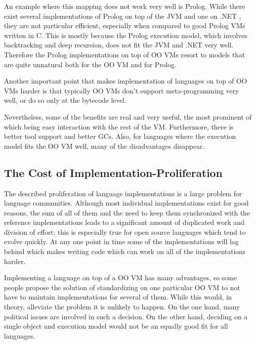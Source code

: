 \documentclass{llncs}
\begin{document}
\begin{itemize}
An example where this mapping does not work very well is Prolog. While there
exist several implementations of Prolog on top of the JVM \cite{prologcafe}
\cite{InterProlog} and one on .NET \cite{psharp},
they are not particular efficient, especially when compared to good Prolog VMs
written in C. This is mostly because the Prolog execution model, which
involves backtracking and deep recursion, does not fit the JVM and .NET very
well. Therefore the Prolog implementations on top of OO VMs resort to models
that are quite unnatural both for the OO VM and for Prolog.

Another important point that makes implementation of languages on top of OO VMs
harder is that typically OO VMs don't support meta-programming very well, or do so only
at the bytecode level.
\end{itemize}

Nevertheless, some of the benefits are real and very useful, the most
prominent of which being easy interaction with the rest of the VM. Furthermore, there
is better tool support and better GCs. Also, for languages where the execution
model fits the OO VM well, many of the disadvantages disappear.


\subsection{The Cost of Implementation-Proliferation}

The described proliferation of language implementations is a large problem for
language communities. Although most individual implementations exist for good
reasons, the sum of all of them and the need to keep them synchronized with the
reference implementations leads to a significant amount of duplicated work and division of
effort; this is especially true for open source languages which tend to evolve
quickly. At any one point in time some of the implementations will lag behind
which makes writing code which can work on all of the implementations harder.

Implementing a language on top of a OO VM has many advantages, so some
people propose the solution of standardizing on one particular OO VM to not have
to maintain implementations for several of them. While this would, in theory,
alleviate the problem it is unlikely to happen. On the one hand, many political
issues are involved in such a decision. On the other hand, deciding on a single
object and execution model would not be an equally good fit for all languages.
\end{document}
